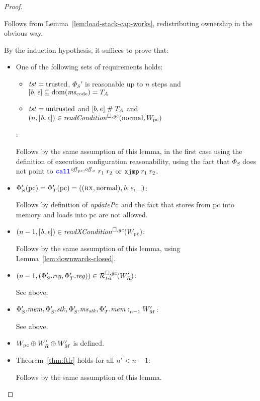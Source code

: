 \begin{proof}
\begin{itemize}
    Follows from Lemma~\ref{lem:load-stack-cap-works}, redistributing ownership in the obvious way.

  \end{itemize}

  By the induction hypothesis, it suffices to prove that:
  \begin{itemize}
  \item One of the following sets of requirements holds:
    \begin{itemize}
    \item $\trust = \trusted$, $\Phi_S'$ is reasonable up to $n$ steps and $[\baddr,\eaddr] \subseteq \dom(\mscode) = \ta$
    \item $\trust = \untrusted$ and $[b,e] \mathrel{\#} \ta$ and $\npair{[\baddr,\eaddr]} \in \readCond{\normal,W_\pcreg}$
    \end{itemize}:

    Follows by the same assumption of this lemma, in the first case using the definition of execution configuration reasonability, using the fact that $\Phi_S$ does not point to $\scall{\offpc,\offsigma}{r_1}{r_2}$ or $\txjmp{r_1}{r_2}$.

  \item $\Phi_S'(\pcreg) = \Phi_T'(\pcreg) = ((\rx,\normal),\baddr,\eaddr,\_)$:

    Follows by definition of $\updPcAddr{}$ and the fact that stores from pc into memory and loads into pc are not allowed.

  \item $\npair[n-1]{[\baddr,\eaddr]} \in \xReadCond{W_\pcreg}$:

    Follows by the same assumption of this lemma, using Lemma~\ref{lem:downwards-closed}.

  \item $\npair[n-1]{(\Phi_S'.\reg,\Phi_T'.\reg)} \in \lrrg{\trust}(W_R')$:

    See above.

  \item $\memSat[n-1]{\Phi_S'.\mem,\Phi_S'.\stk,\Phi_S'.\ms_\stk,\Phi_T'.\mem}{W_M'}$:

    See above.

  \item $W_\pcreg \oplus W_R' \oplus W_M'$ is defined.

  \item Theorem~\ref{thm:ftlr} holds for all $n' < n-1$:

    Follows by the same assumption of this lemma.
  \end{itemize}


\end{proof}
